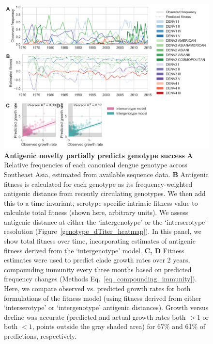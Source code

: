 \documentclass[11pt,oneside,letterpaper]{article}
\begin{document}
\begin{figure}[ht]
  \begin{centering}
\includegraphics[width=\linewidth]{../figures/png/genotype-fitness.png}
    \caption{\textbf{Antigenic novelty partially predicts genotype success }
    \textbf{A} Relative frequencies of each canonical dengue genotype across Southeast Asia, estimated from available sequence data.
    \textbf{B} Antigenic fitness is calculated for each genotype as its frequency-weighted antigenic distance from recently circulating genotypes.
    We then add this to a time-invariant, serotype-specific intrinsic fitness value to calculate total fitness (shown here, arbitrary units).
    We assess antigenic distance at either the `intergenotype' or the `interserotype' resolution (Figure~\ref{genotype_dTiter_heatmap}).
    In this panel, we show total fitness over time, incorporating estimates of antigenic fitness derived from the `intergenotype' model.
    \textbf{C, D}  Fitness estimates were used to predict clade growth rates over 2 years, compounding immunity every three months based on predicted frequency changes (Methods Eq.~\ref{eq_compounding_immunity}).
    Here, we compare observed vs. predicted growth rates for both formulations of the fitness model (using fitness derived from either `interserotype' or `intergenotype' antigenic distances).
    Growth versus decline was accurate (predicted and actual growth rates both $> 1$ or both $< 1$, points outside the gray shaded area) for 67\% and 61\% of predictions, respectively.
}
     \label{genotype_fitness}
   \end{centering}
\end{figure}
\end{document}
